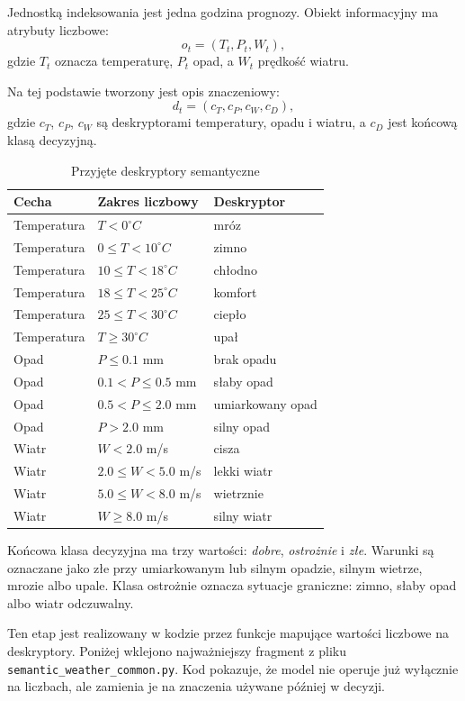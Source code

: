 \documentclass[a4paper,12pt]{article}
\begin{document}
Jednostką indeksowania jest jedna godzina prognozy. Obiekt informacyjny ma
atrybuty liczbowe:
\[
    o_t = (T_t, P_t, W_t),
\]
gdzie \(T_t\) oznacza temperaturę, \(P_t\) opad, a \(W_t\) prędkość wiatru.

\noindent
Na tej podstawie tworzony jest opis znaczeniowy:
\[
    d_t = (c_T, c_P, c_W, c_D),
\]
gdzie \(c_T\), \(c_P\), \(c_W\) są deskryptorami temperatury, opadu i wiatru,
a \(c_D\) jest końcową klasą decyzyjną.

\begin{table}[!h]
\centering
\caption{Przyjęte deskryptory semantyczne}
\begin{tabular}{lll}
\toprule
Cecha & Zakres liczbowy & Deskryptor \\
\midrule
Temperatura & \(T < 0^\circ C\) & mróz \\
Temperatura & \(0 \leq T < 10^\circ C\) & zimno \\
Temperatura & \(10 \leq T < 18^\circ C\) & chłodno \\
Temperatura & \(18 \leq T < 25^\circ C\) & komfort \\
Temperatura & \(25 \leq T < 30^\circ C\) & ciepło \\
Temperatura & \(T \geq 30^\circ C\) & upał \\
\midrule
Opad & \(P \leq 0.1\) mm & brak opadu \\
Opad & \(0.1 < P \leq 0.5\) mm & słaby opad \\
Opad & \(0.5 < P \leq 2.0\) mm & umiarkowany opad \\
Opad & \(P > 2.0\) mm & silny opad \\
\midrule
Wiatr & \(W < 2.0\) m/s & cisza \\
Wiatr & \(2.0 \leq W < 5.0\) m/s & lekki wiatr \\
Wiatr & \(5.0 \leq W < 8.0\) m/s & wietrznie \\
Wiatr & \(W \geq 8.0\) m/s & silny wiatr \\
\bottomrule
\end{tabular}
\end{table}

\noindent
Końcowa klasa decyzyjna ma trzy wartości: \textit{dobre}, \textit{ostrożnie}
i \textit{złe}. Warunki są oznaczane jako złe przy umiarkowanym lub silnym
opadzie, silnym wietrze, mrozie albo upale. Klasa ostrożnie oznacza sytuacje
graniczne: zimno, słaby opad albo wiatr odczuwalny.

\noindent
Ten etap jest realizowany w kodzie przez funkcje mapujące wartości liczbowe na
deskryptory. Poniżej wklejono najważniejszy fragment z pliku
\texttt{semantic\_weather\_common.py}. Kod pokazuje, że model nie operuje już
wyłącznie na liczbach, ale zamienia je na znaczenia używane później w decyzji.
\end{document}
